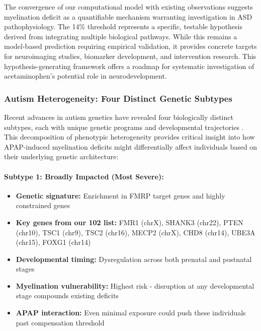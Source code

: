 \documentclass[11pt]{article}
\let\oldsubsubsection\subsubsection
\renewcommand{\subsubsection}[1]{\oldsubsubsection{#1}\setlength{\leftskip}{1.5em}}
\begin{document}
The convergence of our computational model with existing observations suggests myelination deficit as a quantifiable mechanism warranting investigation in ASD pathophysiology. The 14\% threshold represents a specific, testable hypothesis derived from integrating multiple biological pathways. While this remains a model-based prediction requiring empirical validation, it provides concrete targets for neuroimaging studies, biomarker development, and intervention research. This hypothesis-generating framework offers a roadmap for systematic investigation of acetaminophen's potential role in neurodevelopment.

\subsubsection{Autism Heterogeneity: Four Distinct Genetic Subtypes}

Recent advances in autism genetics have revealed four biologically distinct subtypes, each with unique genetic programs and developmental trajectories \citep{litman2025}. This decomposition of phenotypic heterogeneity provides critical insight into how APAP-induced myelination deficits might differentially affect individuals based on their underlying genetic architecture:

\paragraph{Subtype 1: Broadly Impacted (Most Severe):}
\begin{itemize}
\item \textbf{Genetic signature:} Enrichment in FMRP target genes and highly constrained genes
\item \textbf{Key genes from our 102 list:} FMR1 (chrX), SHANK3 (chr22), PTEN (chr10), TSC1 (chr9), TSC2 (chr16), MECP2 (chrX), CHD8 (chr14), UBE3A (chr15), FOXG1 (chr14)
\item \textbf{Developmental timing:} Dysregulation across both prenatal and postnatal stages
\item \textbf{Myelination vulnerability:} Highest risk - disruption at any developmental stage compounds existing deficits
\item \textbf{APAP interaction:} Even minimal exposure could push these individuals past compensation threshold
\end{itemize}
\end{document}
